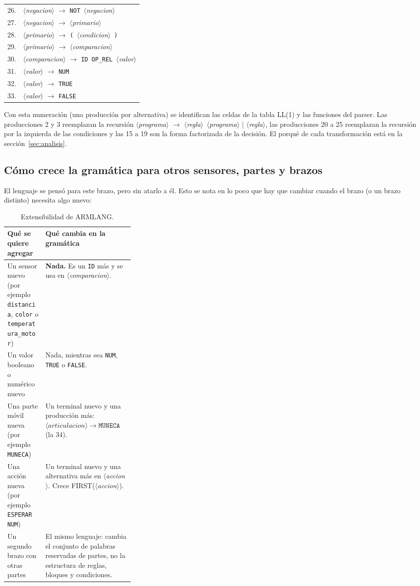 \documentclass[10pt,a4paper]{article}
\newcommand{\nt}[1]{\ensuremath{\langle}\textit{#1}\ensuremath{\rangle}}   %
\newcommand{\tm}[1]{\texttt{#1}}                                          %
\begin{document}
\begin{center}
\begin{tabular}{@{}rl@{}}
26. & \nt{negacion} $\rightarrow$ \tm{NOT}\ \nt{negacion} \\
27. & \nt{negacion} $\rightarrow$ \nt{primario} \\
28. & \nt{primario} $\rightarrow$ \tm{(}\ \nt{condicion}\ \tm{)} \\
29. & \nt{primario} $\rightarrow$ \nt{comparacion} \\
30. & \nt{comparacion} $\rightarrow$ \tm{ID}\ \tm{OP\_REL}\ \nt{valor} \\
31. & \nt{valor} $\rightarrow$ \tm{NUM} \\
32. & \nt{valor} $\rightarrow$ \tm{TRUE} \\
33. & \nt{valor} $\rightarrow$ \tm{FALSE} \\
\end{tabular}
\end{center}

Con esta numeración (una producción por alternativa) se identifican las celdas de la tabla
LL(1) y las funciones del parser. Las producciones 2 y 3 reemplazan la recursión
\nt{programa} $\rightarrow$ \nt{regla}\ \nt{programa} $\mid$ \nt{regla}, las producciones 20 a 25
reemplazan la recursión por la izquierda de las condiciones y las 15 a 19 son la forma
factorizada de la decisión. El porqué de cada transformación está en la sección~\ref{sec:analisis}.

\subsection{Cómo crece la gramática para otros sensores, partes y brazos}
\label{sec:extensible}

El lenguaje se pensó para este brazo, pero sin atarlo a él. Esto se nota en lo poco que hay que
cambiar cuando el brazo (o un brazo distinto) necesita algo nuevo:

\begin{table}[H]
\centering\small
\begin{tabularx}{\linewidth}{|L{0.30\linewidth}|X|}
\hline
\textbf{Qué se quiere agregar} & \textbf{Qué cambia en la gramática} \\
\hline
Un sensor nuevo (por ejemplo \tm{distancia}, \tm{color} o \tm{temperatura\_motor}) & \textbf{Nada.} Es un \tm{ID} más y se usa en \nt{comparacion}. \\
\hline
Un valor booleano o numérico nuevo & Nada, mientras sea \tm{NUM}, \tm{TRUE} o \tm{FALSE}. \\
\hline
Una parte móvil nueva (por ejemplo \tm{MUNECA}) & Un terminal nuevo y una producción más: $\nt{articulacion} \rightarrow \tm{MUNECA}$ (la 34). \\
\hline
Una acción nueva (por ejemplo \tm{ESPERAR NUM}) & Un terminal nuevo y una alternativa más en \nt{accion}. Crece FIRST(\nt{accion}). \\
\hline
Un segundo brazo con otras partes & El mismo lenguaje: cambia el conjunto de palabras reservadas de partes, no la estructura de reglas, bloques y condiciones. \\
\hline
\end{tabularx}
\caption{Extensibilidad de ARMLANG.}
\label{tab:extensible}
\end{table}
\end{document}

